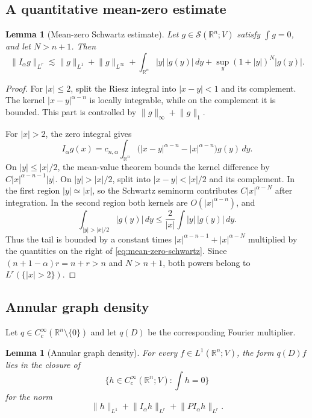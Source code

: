 \documentclass[11pt]{amsart}
\numberwithin{equation}{section}
\newtheorem{lemma}[theorem]{Lemma}
\theoremstyle{definition}
\theoremstyle{remark}
\newcommand{\R}{\mathbb R}
\newcommand{\cS}{\mathcal S}
\newcommand{\norm}[1]{\lVert #1\rVert}
\begin{document}
\subsection{A quantitative mean-zero estimate}

\begin{lemma}[Mean-zero Schwartz estimate]\label{lem:mean-zero-schwartz}
Let $g\in\cS(\R^n;V)$ satisfy $\int g=0$, and let $N>n+1$.  Then
\begin{equation}\label{eq:mean-zero-schwartz}
 \norm{I_\alpha g}_{L^r}
 \lesssim
 \norm{g}_{L^1}+\norm{g}_{L^\infty}
 +\int_{\R^n}|y|\,|g(y)|\,dy
 +\sup_y(1+|y|)^N|g(y)|.
\end{equation}
\end{lemma}

\begin{proof}
For $|x|\le2$, split the Riesz integral into $|x-y|<1$ and its complement.
The kernel $|x-y|^{\alpha-n}$ is locally integrable, while on the complement
it is bounded.  This part is controlled by
$\norm g_\infty+\norm g_1$.

For $|x|>2$, the zero integral gives
\begin{equation}\label{eq:mean-zero-tail}
 I_\alpha g(x)
 =c_{n,\alpha}\int_{\R^n}
 \bigl(|x-y|^{\alpha-n}-|x|^{\alpha-n}\bigr)g(y)\,dy.
\end{equation}
On $|y|\le|x|/2$, the mean-value theorem bounds the kernel difference by
$C|x|^{\alpha-n-1}|y|$.  On $|y|>|x|/2$, split into
$|x-y|<|x|/2$ and its complement.  In the first region $|y|\simeq|x|$, so the
Schwartz seminorm contributes $C|x|^{\alpha-N}$ after integration.  In the
second region both kernels are $O(|x|^{\alpha-n})$, and
\[
 \int_{|y|>|x|/2}|g(y)|\,dy
 \le \frac2{|x|}\int|y|\,|g(y)|\,dy.
\]
Thus the tail is bounded by a constant times
$|x|^{\alpha-n-1}+|x|^{\alpha-N}$ multiplied by the quantities on the right of
\eqref{eq:mean-zero-schwartz}.  Since
$(n+1-\alpha)r=n+r>n$ and $N>n+1$, both powers belong to
$L^r(\{|x|>2\})$.
\end{proof}

\subsection{Annular graph density}
Let $q\in C_c^\infty(\R^n\setminus\{0\})$ and let $q(D)$ be the corresponding
Fourier multiplier.

\begin{lemma}[Annular graph density]\label{lem:annular-density}
For every $f\in L^1(\R^n;V)$, the form $q(D)f$ lies in the closure of
\[
 \{h\in C_c^\infty(\R^n;V):\int h=0\}
\]
for the norm
\begin{equation}\label{eq:graph-density-norm}
 \norm h_{L^1}+\norm{I_\alpha h}_{L^r}
 +\norm{P I_\alpha h}_{L^r}.
\end{equation}
\end{lemma}
\end{document}
